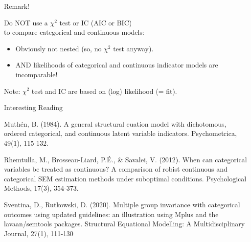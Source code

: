 \documentclass[10pt]{beamer}\usepackage[]{graphicx}\usepackage[]{xcolor}
\begin{document}
\begin{frame}{Remark!}
	
Do NOT use a $\chi^2$ test or IC (AIC or BIC) \\
to compare categorical and continuous models:

\vspace{5mm}

\begin{itemize}
	\item Obviously not nested (so, no $\chi^2$ test anyway).
	\item AND likelihoods of categorical and continuous indicator models are incomparable!
\end{itemize}
	
	\vspace{5mm}
	
	Note: $\chi^2$ test and IC are based on (log) likelihood (= fit).
	
\end{frame}


%	
%	
%


\begin{frame}{Interesting Reading}
	
	Muthén, B. (1984). A general structural euation model with dichotomous, ordered categorical, and continuous latent variable indicators. Psychometrica, 49(1), 115-132.
	
	\vspace{5mm}
	
	Rhemtulla, M., Brosseau-Liard, P.É., \& Savalei, V. (2012). When can categorical variables be treated as continuous? A comparison of robist continuous and categorical SEM estimation methods under suboptimal conditions. Psychological Methods, 17(3), 354-373. 
	
	\vspace{5mm}
	
	Sventina, D., Rutkowski, D. (2020). Multiple group invariance with categorical outcomes using updated guidelines: an illustration using Mplus and the lavaan/semtools packages. Structural Equational Modelling: A Multidisciplinary Journal, 27(1), 111-130

\end{frame}
%
%
\end{document}
